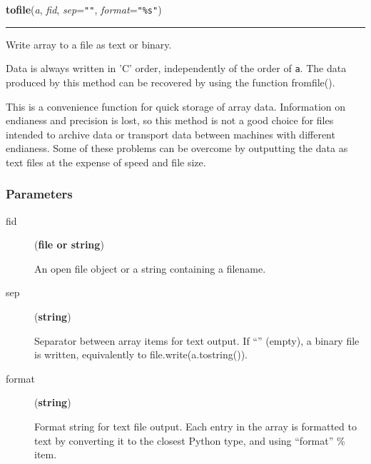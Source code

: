     \begin{boxedminipage}{\textwidth}

    \raggedright \textbf{tofile}(\textit{a}, \textit{fid}, \textit{sep}=\texttt{""}, \textit{format}=\texttt{"\%s"})

    \vspace{-1.5ex}

    \rule{\textwidth}{0.5\fboxrule}

Write array to a file as text or binary.

Data is always written in 'C' order, independently of the order of \texttt{a}.
The data produced by this method can be recovered by using the function
fromfile().

This is a convenience function for quick storage of array data.
Information on endianess and precision is lost, so this method is not a
good choice for files intended to archive data or transport data between
machines with different endianess. Some of these problems can be overcome
by outputting the data as text files at the expense of speed and file size.



\hypertarget{parameters}{}
\subsubsection*{Parameters}
\begin{description}
\item[{fid}] (\textbf{file or string})

An open file object or a string containing a filename.

\item[{sep}] (\textbf{string})

Separator between array items for text output.
If ``'' (empty), a binary file is written, equivalently to
file.write(a.tostring()).

\item[{format}] (\textbf{string})

Format string for text file output.
Each entry in the array is formatted to text by converting it to the
closest Python type, and using ``format'' {\%} item.

\end{description}
    \vspace{1ex}

    \end{boxedminipage}

